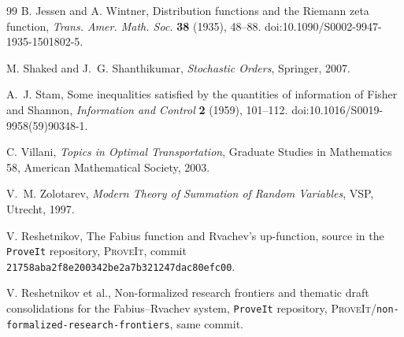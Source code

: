 \documentclass[11pt,oneside]{article}
\numberwithin{equation}{section}
\theoremstyle{definition}
\theoremstyle{remark}
\newcommand{\repo}{\textsc{ProveIt}}
\begin{document}
\begin{thebibliography}{99}
B. Jessen and A. Wintner,
\newblock Distribution functions and the Riemann zeta function,
\newblock \emph{Trans. Amer. Math. Soc.} \textbf{38} (1935), 48--88.
\newblock doi:10.1090/S0002-9947-1935-1501802-5.

M. Shaked and J.~G. Shanthikumar,
\newblock \emph{Stochastic Orders},
\newblock Springer, 2007.

A.~J. Stam,
\newblock Some inequalities satisfied by the quantities of information of Fisher and Shannon,
\newblock \emph{Information and Control} \textbf{2} (1959), 101--112.
\newblock doi:10.1016/S0019-9958(59)90348-1.

C. Villani,
\newblock \emph{Topics in Optimal Transportation},
\newblock Graduate Studies in Mathematics 58, American Mathematical Society, 2003.

V.~M. Zolotarev,
\newblock \emph{Modern Theory of Summation of Random Variables},
\newblock VSP, Utrecht, 1997.

V. Reshetnikov,
\newblock The Fabius function and Rvachev's up-function,
\newblock source in the \texttt{ProveIt} repository, \repo{}, commit \texttt{21758aba2f8e200342be2a7b321247dac80efc00}.

V. Reshetnikov et al.,
\newblock Non-formalized research frontiers and thematic draft consolidations for the Fabius--Rvachev system,
\newblock \texttt{ProveIt} repository, \repo{}/\texttt{non-formalized-research-frontiers}, same commit.

\end{thebibliography}
\end{document}

